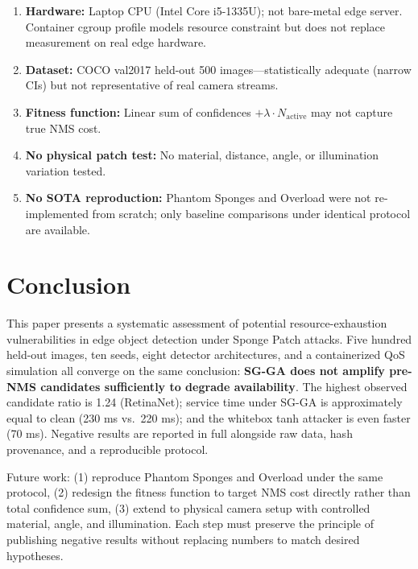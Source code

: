 \documentclass[a4paper,fleqn]{cas-dc}
\begin{document}
\begin{enumerate}
    \item \textbf{Hardware:} Laptop CPU (Intel Core i5-1335U); not bare-metal edge server. Container cgroup profile models resource constraint but does not replace measurement on real edge hardware.
    \item \textbf{Dataset:} COCO val2017 held-out 500 images---statistically adequate (narrow CIs) but not representative of real camera streams.
    \item \textbf{Fitness function:} Linear sum of confidences $+ \lambda \cdot N_\text{active}$ may not capture true NMS cost.
    \item \textbf{No physical patch test:} No material, distance, angle, or illumination variation tested.
    \item \textbf{No SOTA reproduction:} Phantom Sponges and Overload were not re-implemented from scratch; only baseline comparisons under identical protocol are available.
\end{enumerate}

\section{Conclusion}

This paper presents a systematic assessment of potential resource-exhaustion vulnerabilities in edge object detection under Sponge Patch attacks. Five hundred held-out images, ten seeds, eight detector architectures, and a containerized QoS simulation all converge on the same conclusion: \textbf{SG-GA does not amplify pre-NMS candidates sufficiently to degrade availability}. The highest observed candidate ratio is 1.24 (RetinaNet); service time under SG-GA is approximately equal to clean (230 ms vs.\ 220 ms); and the whitebox tanh attacker is even faster (70 ms). Negative results are reported in full alongside raw data, hash provenance, and a reproducible protocol.

Future work: (1) reproduce Phantom Sponges and Overload under the same protocol, (2) redesign the fitness function to target NMS cost directly rather than total confidence sum, (3) extend to physical camera setup with controlled material, angle, and illumination. Each step must preserve the principle of publishing negative results without replacing numbers to match desired hypotheses.
\end{document}

